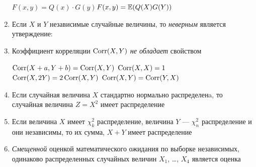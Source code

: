 \documentclass[12pt, a4paper]{article}\usepackage[]{graphicx}\usepackage[]{color}
\begin{document}
\begin{enumerate}
{$F(x,y)=Q(x)\cdot G(y)$}{$F(x,y)=\mathbb{E}(Q(X)G(Y))$}

\item Если $X$ и $Y$ независимые случайные величины, то \emph{неверным} является утверждение:




\item Коэффициент корреляции $\operatorname{Corr}(X,Y)$ \emph{не обладает} свойством

{$\operatorname{Corr}(X+a,Y+b)=\operatorname{Corr}(X,Y)$}
{$\operatorname{Corr}(X,X)=1$}
{$\operatorname{Corr}(X,2Y)=2\operatorname{Corr}(X,Y)$}
{$\operatorname{Corr}(X,Y)= \operatorname{Corr}(Y,X)$}



\item Если случайная величина $X$ стандартно нормально распределенa, то случайная величина $Z=X^2$ имеет распределение


\item Если величина $X$ имеет $\chi^2_k$ распределение, величина $Y$ — $\chi^2_n$ распределение и они независимы, то их сумма, $X+Y$ имеет распределение


\item \emph{Смещенной} оценкой математического ожидания по выборке независимых, одинаково распределенных случайных величин $X_1$, \ldots, $X_4$ является оценка


\end{enumerate}
\end{document}
